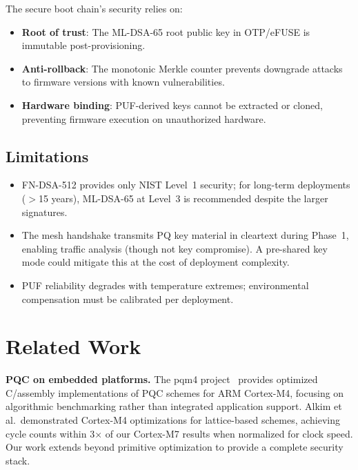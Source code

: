 \documentclass[conference,10pt]{IEEEtran}
\begin{document}
The secure boot chain's security relies on:
\begin{itemize}[leftmargin=*]
  \item \textbf{Root of trust}: The ML-DSA-65 root public key in OTP/eFUSE is immutable post-provisioning.
  \item \textbf{Anti-rollback}: The monotonic Merkle counter prevents downgrade attacks to firmware versions with known vulnerabilities.
  \item \textbf{Hardware binding}: PUF-derived keys cannot be extracted or cloned, preventing firmware execution on unauthorized hardware.
\end{itemize}

\subsection{Limitations}

\begin{itemize}[leftmargin=*]
  \item FN-DSA-512 provides only NIST Level~1 security; for long-term deployments ($>$15 years), ML-DSA-65 at Level~3 is recommended despite the larger signatures.
  \item The mesh handshake transmits PQ key material in cleartext during Phase~1, enabling traffic analysis (though not key compromise). A pre-shared key mode could mitigate this at the cost of deployment complexity.
  \item PUF reliability degrades with temperature extremes; environmental compensation must be calibrated per deployment.
\end{itemize}

\section{Related Work}
\label{sec:related}

\textbf{PQC on embedded platforms.} The pqm4 project~\cite{pqc_embedded_arm} provides optimized C/assembly implementations of PQC schemes for ARM Cortex-M4, focusing on algorithmic benchmarking rather than integrated application support. Alkim et al.\ demonstrated Cortex-M4 optimizations for lattice-based schemes, achieving cycle counts within 3$\times$ of our Cortex-M7 results when normalized for clock speed. Our work extends beyond primitive optimization to provide a complete security stack.
\end{document}
